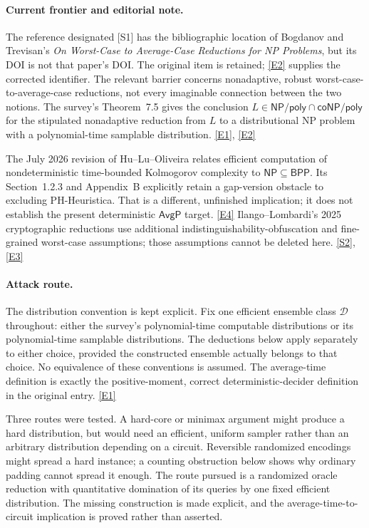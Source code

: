 \documentclass[11pt]{article}
\newcommand{\sref}[2]{\hyperlink{source:#1:#2}{[S#2]}}
\newcommand{\eref}[2]{\hyperlink{extra:#1:#2}{[E#2]}}
\begin{document}
\paragraph{Current frontier and editorial note.}
The reference designated [S1] has the bibliographic location of Bogdanov
and Trevisan's \emph{On Worst-Case to Average-Case Reductions for NP
Problems}, but its DOI is not that paper's DOI. The original item is
retained; \eref{statement}{2} supplies the corrected identifier. The relevant
barrier concerns nonadaptive, robust worst-case-to-average-case reductions,
not every imaginable connection between the two notions. The survey's
Theorem~7.5 gives the conclusion
$L\in\mathsf{NP/poly}\cap\mathsf{coNP/poly}$ for the stipulated
nonadaptive reduction from $L$ to a distributional NP problem with a
polynomial-time samplable distribution. \eref{statement}{1}, \eref{statement}{2}

The July 2026 revision of Hu--Lu--Oliveira relates efficient computation
of nondeterministic time-bounded Kolmogorov complexity to
$\mathsf{NP}\subseteq\mathsf{BPP}$. Its Section~1.2.3 and Appendix~B
explicitly retain a gap-version obstacle to excluding PH-Heuristica.
That is a different, unfinished implication; it does not establish the
present deterministic $\mathsf{AvgP}$ target. \eref{statement}{4}
Ilango--Lombardi's 2025 cryptographic reductions use additional
indistinguishability-obfuscation and fine-grained worst-case assumptions;
those assumptions cannot be deleted here. \sref{statement}{2}, \eref{statement}{3}

\paragraph{Attack route.}
The distribution convention is kept explicit. Fix one efficient ensemble
class $\mathcal D$ throughout: either the survey's polynomial-time
computable distributions or its polynomial-time samplable distributions.
The deductions below apply separately to either choice, provided the
constructed ensemble actually belongs to that choice. No equivalence of
these conventions is assumed. The average-time definition is exactly the
positive-moment, correct deterministic-decider definition in the original
entry. \eref{statement}{1}

Three routes were tested. A hard-core or minimax argument might produce a
hard distribution, but would need an efficient, uniform sampler rather
than an arbitrary distribution depending on a circuit. Reversible
randomized encodings might spread a hard instance; a counting obstruction
below shows why ordinary padding cannot spread it enough. The route
pursued is a randomized oracle reduction with quantitative domination of
its queries by one fixed efficient distribution. The missing construction
is made explicit, and the average-time-to-circuit implication is proved
rather than asserted.
\end{document}
